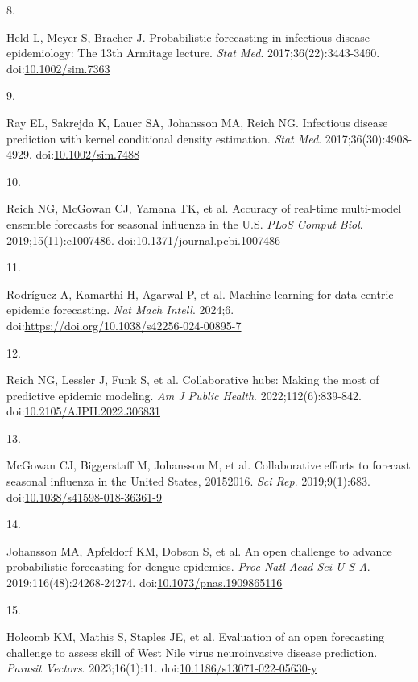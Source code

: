 \documentclass[
]{article}
\newlength{\cslhangindent}
\newlength{\csllabelwidth}
\newenvironment{CSLReferences}[2] %
 {\begin{list}{}{%
  \setlength{\itemindent}{0pt}
  \setlength{\leftmargin}{0pt}
  \setlength{\parsep}{0pt}
  \ifodd #1
   \setlength{\leftmargin}{\cslhangindent}
   \setlength{\itemindent}{-1\cslhangindent}
  \fi
  \setlength{\itemsep}{#2\baselineskip}}}
 {\end{list}}
\newcommand{\CSLLeftMargin}[1]{\parbox[t]{\csllabelwidth}{\strut#1\strut}}
\newcommand{\CSLRightInline}[1]{\parbox[t]{\linewidth - \csllabelwidth}{\strut#1\strut}}
\begin{document}
\begin{CSLReferences}{0}{1}
\CSLLeftMargin{8. }%
\CSLRightInline{Held L, Meyer S, Bracher J. Probabilistic forecasting in
infectious disease epidemiology: The 13th {Armitage} lecture. \emph{Stat
Med}. 2017;36(22):3443-3460.
doi:\href{https://doi.org/10.1002/sim.7363}{10.1002/sim.7363}}

\CSLLeftMargin{9. }%
\CSLRightInline{Ray EL, Sakrejda K, Lauer SA, Johansson MA, Reich NG.
Infectious disease prediction with kernel conditional density
estimation. \emph{Stat Med}. 2017;36(30):4908-4929.
doi:\href{https://doi.org/10.1002/sim.7488}{10.1002/sim.7488}}

\CSLLeftMargin{10. }%
\CSLRightInline{Reich NG, McGowan CJ, Yamana TK, et al. Accuracy of
real-time multi-model ensemble forecasts for seasonal influenza in the
{U}.{S}. \emph{PLoS Comput Biol}. 2019;15(11):e1007486.
doi:\href{https://doi.org/10.1371/journal.pcbi.1007486}{10.1371/journal.pcbi.1007486}}

\CSLLeftMargin{11. }%
\CSLRightInline{Rodríguez A, Kamarthi H, Agarwal P, et al. Machine
learning for data-centric epidemic forecasting. \emph{Nat Mach Intell}.
2024;6. doi:\url{https://doi.org/10.1038/s42256-024-00895-7}}

\CSLLeftMargin{12. }%
\CSLRightInline{Reich NG, Lessler J, Funk S, et al. Collaborative hubs:
Making the most of predictive epidemic modeling. \emph{Am J Public
Health}. 2022;112(6):839-842.
doi:\href{https://doi.org/10.2105/AJPH.2022.306831}{10.2105/AJPH.2022.306831}}

\CSLLeftMargin{13. }%
\CSLRightInline{McGowan CJ, Biggerstaff M, Johansson M, et al.
Collaborative efforts to forecast seasonal influenza in the United
States, 2015{\textendash}2016. \emph{Sci Rep}. 2019;9(1):683.
doi:\href{https://doi.org/10.1038/s41598-018-36361-9}{10.1038/s41598-018-36361-9}}

\CSLLeftMargin{14. }%
\CSLRightInline{Johansson MA, Apfeldorf KM, Dobson S, et al. An open
challenge to advance probabilistic forecasting for dengue epidemics.
\emph{Proc Natl Acad Sci U S A}. 2019;116(48):24268-24274.
doi:\href{https://doi.org/10.1073/pnas.1909865116}{10.1073/pnas.1909865116}}

\CSLLeftMargin{15. }%
\CSLRightInline{Holcomb KM, Mathis S, Staples JE, et al. Evaluation of
an open forecasting challenge to assess skill of {West} {Nile} virus
neuroinvasive disease prediction. \emph{Parasit Vectors}. 2023;16(1):11.
doi:\href{https://doi.org/10.1186/s13071-022-05630-y}{10.1186/s13071-022-05630-y}}


\end{CSLReferences}
\end{document}
